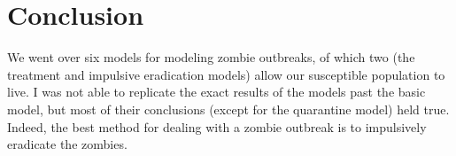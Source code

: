 \documentclass[]{article}
\begin{document}
\section{Conclusion}
We went over six models for modeling zombie outbreaks, of which two (the
treatment and impulsive eradication models) allow our susceptible population to live. I
was not able to replicate the exact results of the models past the basic model, but most
of their conclusions (except for the quarantine model) held true. Indeed, the best
method for dealing with a zombie outbreak is to impulsively eradicate the zombies.
\end{document}

